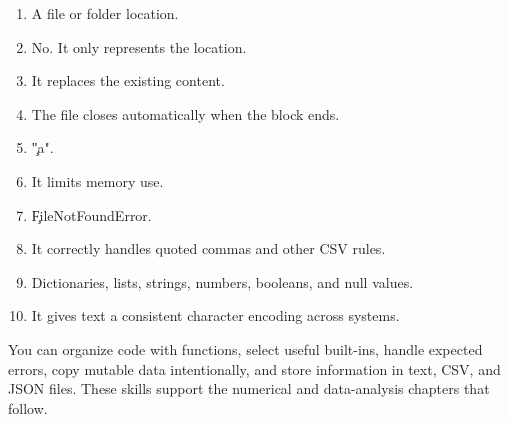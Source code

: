 
\begin{enumerate}
    \item A file or folder location.
    \item No. It only represents the location.
    \item It replaces the existing content.
    \item The file closes automatically when the block ends.
    \item \c{"a"}.
    \item It limits memory use.
    \item \c{FileNotFoundError}.
    \item It correctly handles quoted commas and other CSV rules.
    \item Dictionaries, lists, strings, numbers, booleans, and null values.
    \item It gives text a consistent character encoding across systems.
\end{enumerate}

\begin{tcolorbox}[title=Part III summary,colframe=orange,colback=white,arc=2mm]
You can organize code with functions, select useful built-ins, handle expected
errors, copy mutable data intentionally, and store information in text, CSV,
and JSON files. These skills support the numerical and data-analysis chapters
that follow.
\end{tcolorbox}

